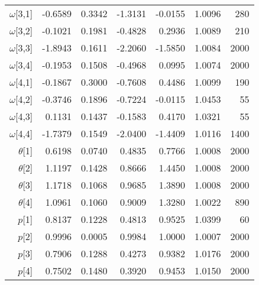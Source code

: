 \documentclass[11pt]{article}
\begin{document}
\begin{table}[ht]
\begin{tabular}{rrrrrrr}
  $\omega$[3,1] & -0.6589 & 0.3342 & -1.3131 & -0.0155 & 1.0096 &   280 \\ 
  $\omega$[3,2] & -0.1021 & 0.1981 & -0.4828 & 0.2936 & 1.0089 &   210 \\ 
  $\omega$[3,3] & -1.8943 & 0.1611 & -2.2060 & -1.5850 & 1.0084 &  2000 \\ 
  $\omega$[3,4] & -0.1953 & 0.1508 & -0.4968 & 0.0995 & 1.0074 &  2000 \\ 
  $\omega$[4,1] & -0.1867 & 0.3000 & -0.7608 & 0.4486 & 1.0099 &   190 \\ 
  $\omega$[4,2] & -0.3746 & 0.1896 & -0.7224 & -0.0115 & 1.0453 &    55 \\ 
  $\omega$[4,3] & 0.1131 & 0.1437 & -0.1583 & 0.4170 & 1.0321 &    55 \\ 
  $\omega$[4,4] & -1.7379 & 0.1549 & -2.0400 & -1.4409 & 1.0116 &  1400 \\ 
   $\theta$[1] & 0.6198 & 0.0740 & 0.4835 & 0.7766 & 1.0008 &  2000 \\ 
   $\theta$[2] & 1.1197 & 0.1428 & 0.8666 & 1.4450 & 1.0008 &  2000 \\ 
   $\theta$[3] & 1.1718 & 0.1068 & 0.9685 & 1.3890 & 1.0008 &  2000 \\ 
  $\theta$[4] & 1.0961 & 0.1060 & 0.9009 & 1.3280 & 1.0022 &   890 \\ 
  $p$[1] & 0.8137 & 0.1228 & 0.4813 & 0.9525 & 1.0399 &    60 \\ 
  $p$[2] & 0.9996 & 0.0005 & 0.9984 & 1.0000 & 1.0007 &  2000 \\ 
  $p$[3] & 0.7906 & 0.1288 & 0.4273 & 0.9382 & 1.0176 &  2000 \\ 
  $p$[4] & 0.7502 & 0.1480 & 0.3920 & 0.9453 & 1.0150 &  2000 \\ 
   \hline
   

\end{tabular}
\end{table}
\end{document}
